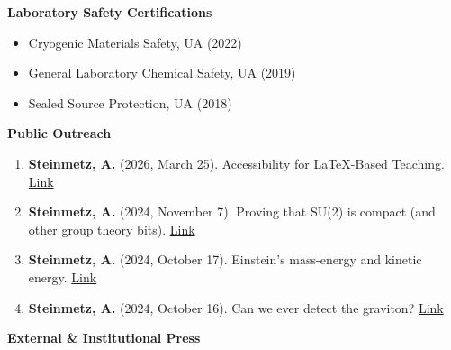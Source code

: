 \documentclass[11pt]{article}
\begin{document}
{\large\textbf{Laboratory Safety Certifications}}

\begin{itemize}[leftmargin=*,nosep]
    \item Cryogenic Materials Safety, UA (2022)
    \item General Laboratory Chemical Safety, UA (2019)
    \item Sealed Source Protection, UA (2018)
\end{itemize}

{\large\textbf{Public Outreach}}

\begin{enumerate}[leftmargin=*,nosep]
    \item \textbf{Steinmetz, A.} (2026, March 25). Accessibility for LaTeX-Based Teaching. \href{https://ajsteinmetz.github.io/mathematics/2026/03/25/latex-accessibility.html}{Link}
    \item \textbf{Steinmetz, A.} (2024, November 7). Proving that SU(2) is compact (and other group theory bits). \href{https://ajsteinmetz.github.io/mathematics/2024/11/07/su2-compactness.html}{Link}
    \item \textbf{Steinmetz, A.} (2024, October 17). Einstein's mass-energy and kinetic energy. \href{https://ajsteinmetz.github.io/physics/2024/10/17/kinetic-energy-coefficient.html}{Link}
    \item \textbf{Steinmetz, A.} (2024, October 16). Can we ever detect the graviton? \href{https://ajsteinmetz.github.io/physics/2024/10/16/graviton-detector.html}{Link}
\end{enumerate}

\medskip

{\Large\textbf{External \& Institutional Press}}
\end{document}
